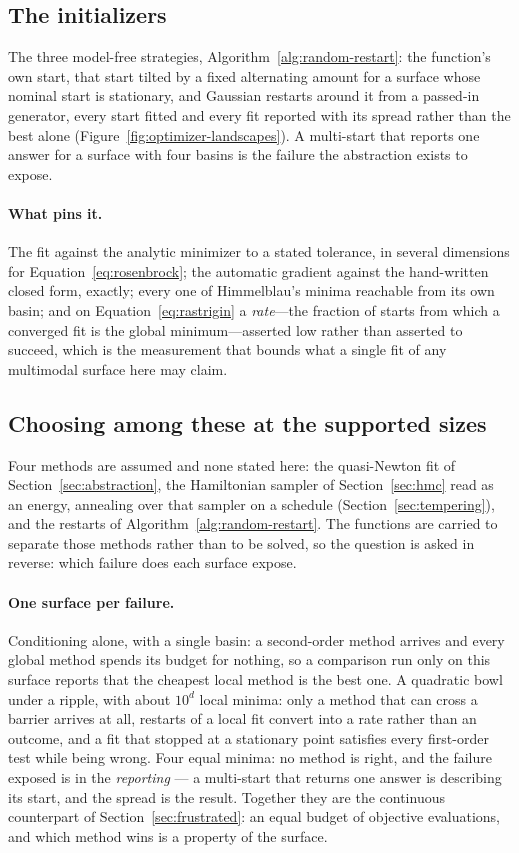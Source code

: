 \documentclass[11pt,a4paper]{article}
\begin{document}
\subsection{The initializers}
The three model-free strategies, Algorithm~\ref{alg:random-restart}: the function's own start, that start tilted
by a fixed alternating amount for a surface whose nominal start is stationary,
and Gaussian restarts around it from a passed-in generator, every start
fitted and every fit reported with its spread rather than the best alone
(Figure~\ref{fig:optimizer-landscapes}). A multi-start that reports one
answer for a surface with four basins is the failure the abstraction exists
to expose.

\paragraph{What pins it.}
The fit against the analytic minimizer to a stated tolerance, in several
dimensions for Equation~\ref{eq:rosenbrock}; the automatic gradient against
the hand-written closed form, exactly; every one of Himmelblau's minima
reachable from its own basin; and on Equation~\ref{eq:rastrigin} a
\emph{rate}---the fraction of starts from which a converged fit is the global
minimum---asserted low rather than asserted to succeed, which is the
measurement that bounds what a single fit of any multimodal surface here may
claim.

\subsection{Choosing among these at the supported sizes}
\label{sec:testfunctions:discussion}
Four methods are assumed and none stated here: the quasi-Newton fit of
Section~\ref{sec:abstraction}, the Hamiltonian sampler of
Section~\ref{sec:hmc} read as an energy, annealing over that sampler on a
schedule (Section~\ref{sec:tempering}), and the restarts of
Algorithm~\ref{alg:random-restart}. The functions are carried to separate those
methods rather than to be solved, so the question is asked in reverse: which
failure does each surface expose.

\paragraph{One surface per failure.}
Conditioning alone, with a single basin: a second-order method arrives and
every global method spends its budget for nothing, so a comparison run only
on this surface reports that the cheapest local method is the best one. A
quadratic bowl under a ripple, with about $10^d$ local minima: only a method
that can cross a barrier arrives at all, restarts of a local fit convert
into a rate rather than an outcome, and a fit that stopped at a stationary
point satisfies every first-order test while being wrong. Four equal minima:
no method is right, and the failure exposed is in the \emph{reporting} --- a
multi-start that returns one answer is describing its start, and the spread
is the result. Together they are the continuous counterpart of
Section~\ref{sec:frustrated}: an equal budget of objective evaluations, and
which method wins is a property of the surface.
\end{document}
